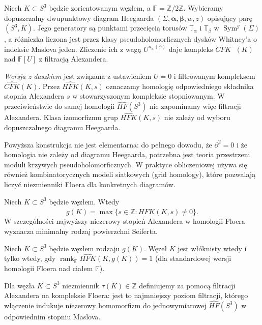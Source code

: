 \begin{definicja}
Niech $K\subset S^3$ będzie zorientowanym węzłem, a
$\mathbb F=\mathbb Z/2\mathbb Z$. Wybieramy dopuszczalny
dwupunktowy diagram Heegaarda $(\Sigma,\boldsymbol\alpha,
\boldsymbol\beta,w,z)$ opisujący parę $(S^3,K)$.
Jego generatory są punktami przecięcia torusów
$\mathbb T_{\alpha}$ i $\mathbb T_{\beta}$ w
$\operatorname{Sym}^{g}(\Sigma)$, a różniczka liczona jest
przez klasy pseudoholomorficznych dysków Whitney'a
o indeksie Maslova jeden. Zliczenie ich z wagą
$U^{n_w(\phi)}$ daje kompleks $CFK^-(K)$ nad
$\mathbb F[U]$ z filtracją Alexandera.

\emph{Wersja z daszkiem} jest związana z ustawieniem $U=0$
i filtrowanym kompleksem $\widehat{CFK}(K)$. Przez
$\widehat{HFK}(K,s)$ oznaczamy homologię odpowiedniego
składnika stopnia Alexandera $s$ w stowarzyszonym
kompleksie stopniowanym. W przeciwieństwie do samej
homologii $\widehat{HF}(S^3)$ nie zapominamy więc filtracji
Alexandera. Klasa izomorfizmu grup $\widehat{HFK}(K,s)$
nie zależy od wyboru dopuszczalnego diagramu Heegaarda.
\end{definicja}

\begin{uwaga}
Powyższa konstrukcja nie jest elementarna: do
pełnego dowodu, że $\partial^2=0$ i że homologia
nie zależy od diagramu Heegaarda, potrzebna jest
teoria przestrzeni moduli krzywych pseudoholomorficznych.
W praktyce obliczeniowej używa się również kombinatorycznych
modeli siatkowych (grid homology), które pozwalają liczyć
niezmienniki Floera dla konkretnych diagramów.
\end{uwaga}

\begin{twierdzenie}
Niech $K\subset S^3$ będzie węzłem. Wtedy
\[
g(K)=\max\{s\in\mathbb Z:\widehat{HFK}(K,s)\ne0\}.
\]
W szczególności najwyższy niezerowy stopień Alexandera
w homologii Floera wyznacza minimalny rodzaj powierzchni
Seiferta.
\end{twierdzenie}

\begin{twierdzenie}
Niech $K\subset S^3$ będzie węzłem rodzaju $g(K)$.
Węzeł $K$ jest włóknisty wtedy i tylko wtedy, gdy
$\operatorname{rank}_{\mathbb F}\widehat{HFK}(K,g(K))=1$
(dla standardowej wersji homologii Floera nad ciałem $\mathbb F$).
\end{twierdzenie}

\begin{definicja}
Dla węzła $K\subset S^3$ niezmiennik
$\tau(K)\in\mathbb Z$ definiujemy za pomocą filtracji
Alexandera na kompleksie Floera: jest to najmniejszy
poziom filtracji, którego włączenie indukuje
niezerowy homomorfizm do jednowymiarowej
$\widehat{HF}(S^3)$ w odpowiednim stopniu Maslova.
\end{definicja}

